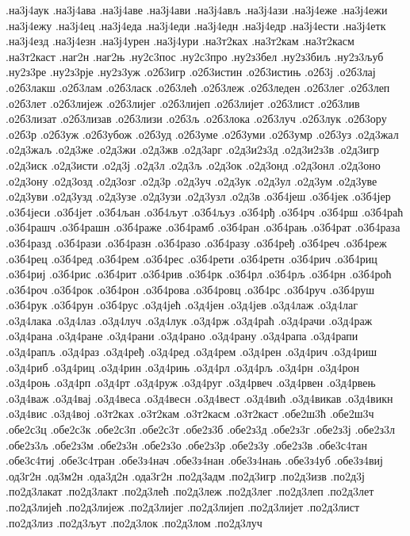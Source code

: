 {.на3ј4аук
.на3ј4ава
.на3ј4аве
.на3ј4ави
.на3ј4ављ
.на3ј4ази
.на3ј4еже
.на3ј4ежи
.на3ј4ежу
.на3ј4ец
.на3ј4еда
.на3ј4еди
.на3ј4едн
.на3ј4едр
.на3ј4ести
.на3ј4етк
.на3ј4езд
.на3ј4езн
.на3ј4урен
.на3ј4ури
.на3т2ках
.на3т2кам
.на3т2касм
.на3т2каст
.наг2н
.наг2њ
.ну2с3пос
.ну2с3про
.ну2з3бел
.ну2з3биљ
.ну2з3љуб
.ну2з3ре
.ну2з3рје
.ну2з3уж
.о2б3игр
.о2б3истин
.о2б3истињ
.о2б3ј
.о2б3лај
.о2б3лакш
.о2б3лам
.о2б3ласк
.о2б3лећ
.о2б3леж
.о2б3леден
.о2б3лег
.о2б3леп
.о2б3лет
.о2б3лијеж
.о2б3лијег
.о2б3лијеп
.о2б3лијет
.о2б3лист
.о2б3лив
.о2б3лизат
.о2б3лизав
.о2б3лизи
.о2б3љ
.о2б3лока
.о2б3луч
.о2б3лук
.о2б3ору
.о2б3р
.о2б3уж
.о2б3убож
.о2б3уд
.о2б3уме
.о2б3уми
.о2б3умр
.о2б3уз
.о2д3жал
.о2д3жаљ
.о2д3же
.о2д3жи
.о2д3жв
.о2д3арг
.о2д3и2з3д
.о2д3и2з3в
.о2д3игр
.о2д3иск
.о2д3исти
.о2д3ј
.о2д3л
.о2д3љ
.о2д3ок
.о2д3онд
.о2д3онл
.о2д3оно
.о2д3ону
.о2д3озд
.о2д3озг
.о2д3р
.о2д3уч
.о2д3ук
.о2д3ул
.о2д3ум
.о2д3уве
.о2д3уви
.о2д3узд
.о2д3узе
.о2д3узи
.о2д3узл
.о2д3в
.о3б4јеш
.о3б4јек
.о3б4јер
.о3б4јеси
.о3б4јет
.о3б4љан
.о3б4љут
.о3б4љуз
.о3б4рђ
.о3б4рч
.о3б4рш
.о3б4раћ
.о3б4рашч
.о3б4рашн
.о3б4раже
.о3б4рамб
.о3б4ран
.о3б4рањ
.о3б4рат
.о3б4раза
.о3б4разд
.о3б4рази
.о3б4разн
.о3б4разо
.о3б4разу
.о3б4ређ
.о3б4реч
.о3б4реж
.о3б4рец
.о3б4ред
.о3б4рем
.о3б4рес
.о3б4рети
.о3б4ретн
.о3б4рич
.о3б4риц
.о3б4риј
.о3б4рис
.о3б4рит
.о3б4рив
.о3б4рк
.о3б4рл
.о3б4рљ
.о3б4рн
.о3б4роћ
.о3б4роч
.о3б4рок
.о3б4рон
.о3б4рова
.о3б4ровц
.о3б4рс
.о3б4руч
.о3б4руш
.о3б4рук
.о3б4рун
.о3б4рус
.о3д4јећ
.о3д4јен
.о3д4јев
.о3д4лаж
.о3д4лаг
.о3д4лака
.о3д4лаз
.о3д4луч
.о3д4лук
.о3д4рж
.о3д4раћ
.о3д4рачи
.о3д4раж
.о3д4рана
.о3д4ране
.о3д4рани
.о3д4рано
.о3д4рану
.о3д4рапа
.о3д4рапи
.о3д4рапљ
.о3д4раз
.о3д4ређ
.о3д4ред
.о3д4рем
.о3д4рен
.о3д4рич
.о3д4риш
.о3д4риб
.о3д4риц
.о3д4рин
.о3д4рињ
.о3д4рл
.о3д4рљ
.о3д4рн
.о3д4рон
.о3д4роњ
.о3д4рп
.о3д4рт
.о3д4руж
.о3д4руг
.о3д4рвеч
.о3д4рвен
.о3д4рвењ
.о3д4важ
.о3д4вај
.о3д4веса
.о3д4весн
.о3д4вест
.о3д4вић
.о3д4викав
.о3д4викн
.о3д4вис
.о3д4вој
.о3т2ках
.о3т2кам
.о3т2касм
.о3т2каст
.обе2ш3ћ
.обе2ш3ч
.обе2с3ц
.обе2с3к
.обе2с3п
.обе2с3т
.обе2з3б
.обе2з3д
.обе2з3г
.обе2з3ј
.обе2з3л
.обе2з3љ
.обе2з3м
.обе2з3н
.обе2з3о
.обе2з3р
.обе2з3у
.обе2з3в
.обе3с4тан
.обе3с4тиј
.обе3с4тран
.обе3з4нач
.обе3з4нан
.обе3з4нањ
.обе3з4уб
.обе3з4виј
.од3г2н
.од3м2н
.ода3д2н
.ода3г2н
.по2д3адм
.по2д3игр
.по2д3изв
.по2д3ј
.по2д3лакат
.по2д3лакт
.по2д3лећ
.по2д3леж
.по2д3лег
.по2д3леп
.по2д3лет
.по2д3лијећ
.по2д3лијеж
.по2д3лијег
.по2д3лијеп
.по2д3лијет
.по2д3лист
.по2д3лиз
.по2д3љут
.по2д3лок
.по2д3лом
.по2д3луч
}
